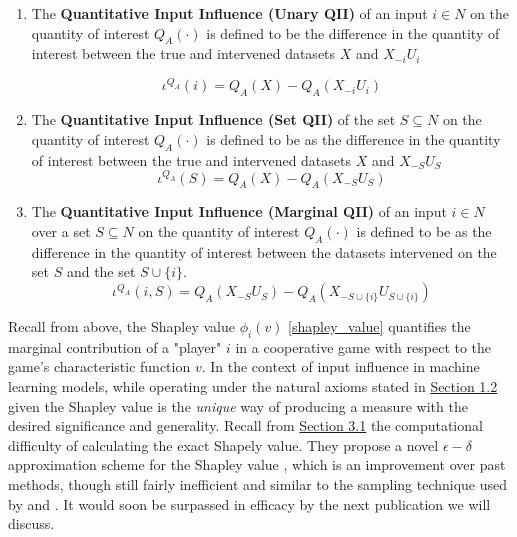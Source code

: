     \begin{enumerate}
        \item The \textbf{Quantitative Input Influence (Unary QII)} of an input $i \in N$ on the quantity of interest $Q_A(\cdot)$ is defined to be the difference in the quantity of interest between the true and intervened datasets $X$ and $X_{-i}U_i$
    
    \begin{equation}
        \label{QII_Equation1}
        \iota^{Q_A}(i) = Q_A(X) - Q_A(X_{-i}U_i)
    \end{equation}
    
        \item The \textbf{Quantitative Input Influence (Set QII)} of the set $S \subseteq N$ on the quantity of interest $Q_A(\cdot)$ is defined to be as the difference in the quantity of interest between the true and intervened datasets $X$ and $X_{-S}U_S$
    \begin{equation}
        \label{QII_Equation1}
        \iota^{Q_A}(S) = Q_A(X) - Q_A(X_{-S}U_S)
    \end{equation}
    
     \item The \textbf{Quantitative Input Influence (Marginal QII)} of an input $i \in N$ over a set $S \subseteq N$ on the quantity of interest $Q_A(\cdot)$ is defined to be as the difference in the quantity of interest between the datasets intervened on the set $S$ and the set $S \cup \{i\}$.
    \begin{equation}
        \label{QII_Equation1}
        \iota^{Q_A}(i,S) = Q_A(X_{-S}U_S) - Q_A(X_{-S \cup \{i\}}U_{S \cup \{i\}})
    \end{equation}
    \end{enumerate}
    
    Recall from above, the Shapley value $\phi_i(v)$ \eqref{shapley_value} quantifies the marginal contribution of a "player" $i$ in a cooperative game with respect to the game's characteristic function $v$. In the context of input influence in machine learning models, while operating under the natural axioms stated in \hyperref[sec:axioms]{Section 1.2} given the Shapley value is the \textit{unique} way of producing a measure with the desired significance and generality. Recall from \hyperref[sec:history]{Section 3.1} the computational difficulty of calculating the exact Shapely value. They propose a novel $\epsilon-\delta$ approximation scheme for the Shapley value \citep{bachrach_approximating_shapley}, which is an improvement over past methods, though still fairly inefficient and similar to the sampling technique used by \citet{strumbelj_efficient_2010} and \citet{regressionInGameTheory_MS4}. It would soon be surpassed in efficacy by the next publication we will discuss.
    
        
        
    